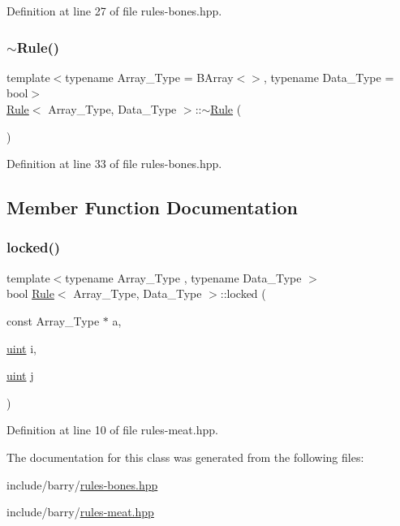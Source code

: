 Definition at line 27 of file rules-\/bones.\+hpp.

\mbox{\label{class_rule_a9f7e4ac4893005c7d4ecc2781f0f727d}} 
\subsubsection{\texorpdfstring{$\sim$\+Rule()}{~Rule()}}
{\footnotesize\ttfamily template$<$typename Array\+\_\+\+Type = B\+Array$<$$>$, typename Data\+\_\+\+Type = bool$>$ \\
\hyperlink{class_rule}{Rule}$<$ Array\+\_\+\+Type, Data\+\_\+\+Type $>$\+::$\sim$\hyperlink{class_rule}{Rule} (\begin{DoxyParamCaption}{ }\end{DoxyParamCaption})\hspace{0.3cm}{\ttfamily [inline]}}



Definition at line 33 of file rules-\/bones.\+hpp.



\subsection{Member Function Documentation}
\mbox{\label{class_rule_a0a9a115c6951a5c8de699d4ff9f69060}} 
\subsubsection{\texorpdfstring{locked()}{locked()}}
{\footnotesize\ttfamily template$<$typename Array\+\_\+\+Type , typename Data\+\_\+\+Type $>$ \\
bool \hyperlink{class_rule}{Rule}$<$ Array\+\_\+\+Type, Data\+\_\+\+Type $>$\+::locked (\begin{DoxyParamCaption}\item[{const Array\+\_\+\+Type $\ast$}]{a,  }\item[{\hyperlink{typedefs_8hpp_a91ad9478d81a7aaf2593e8d9c3d06a14}{uint}}]{i,  }\item[{\hyperlink{typedefs_8hpp_a91ad9478d81a7aaf2593e8d9c3d06a14}{uint}}]{j }\end{DoxyParamCaption})\hspace{0.3cm}{\ttfamily [inline]}}



Definition at line 10 of file rules-\/meat.\+hpp.



The documentation for this class was generated from the following files\+:\begin{DoxyCompactItemize}
\item 
include/barry/\hyperlink{rules-bones_8hpp}{rules-\/bones.\+hpp}\item 
include/barry/\hyperlink{rules-meat_8hpp}{rules-\/meat.\+hpp}\end{DoxyCompactItemize}
